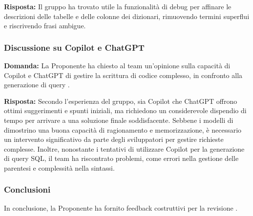 \par \textbf{Risposta:} Il gruppo ha trovato utile la funzionalità di debug per affinare le descrizioni delle tabelle e delle colonne dei dizionari, rimuovendo termini superflui e riscrivendo frasi ambigue.

\subsubsection{Discussione su Copilot e ChatGPT}

\par \textbf{Domanda:} La Proponente ha chiesto al team un'opinione sulla capacità di Copilot e ChatGPT di gestire la scrittura di codice complesso, in confronto alla generazione di query .

\par \textbf{Risposta:} Secondo l'esperienza del gruppo, sia Copilot che ChatGPT offrono ottimi suggerimenti e spunti iniziali, ma richiedono un considerevole dispendio di tempo per arrivare a una soluzione finale soddisfacente. Sebbene i modelli di  dimostrino una buona capacità di ragionamento e memorizzazione, è necessario un intervento significativo da parte degli sviluppatori per gestire richieste complesse. Inoltre, nonostante i tentativi di utilizzare Copilot per la generazione di query SQL, il team ha riscontrato problemi, come errori nella gestione delle parentesi e complessità nella sintassi.

\subsubsection{Conclusioni}

\par In conclusione, la Proponente ha fornito feedback costruttivi per la revisione .
